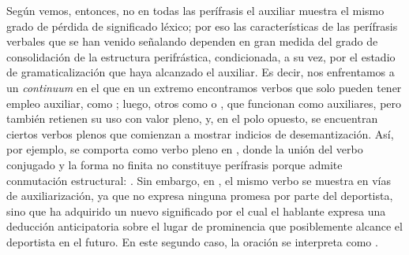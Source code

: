 \begin{recuadro}
Según vemos, entonces, no en todas las perífrasis el auxiliar muestra el mismo
grado de pérdida de significado léxico; por eso las características de las
perífrasis verbales que se han venido señalando dependen en gran medida del grado
de consolidación de la estructura perifrástica, condicionada, a su vez, por el
estadio de gramaticalización que haya alcanzado el auxiliar. Es decir, nos
enfrentamos a un \textit{continuum} en el que en un extremo encontramos verbos
que solo pueden tener empleo auxiliar, como ; luego, otros como
 o , que funcionan como auxiliares, pero también retienen
su uso con valor pleno, y, en el polo opuesto, se encuentran ciertos verbos
plenos que comienzan a mostrar indicios de desemantización. Así, por ejemplo,
 se comporta como verbo pleno en , donde la unión del verbo conjugado y la
forma no finita no constituye perífrasis porque admite conmutación estructural:
. Sin embargo, en , el mismo verbo se muestra en vías
de auxiliarización, ya que no expresa ninguna promesa por parte del deportista,
sino que ha adquirido un nuevo significado por el cual el hablante expresa una
deducción anticipatoria sobre el lugar de prominencia que posiblemente alcance el
deportista en el futuro. En este segundo caso, la oración se interpreta como
.


\end{recuadro}
